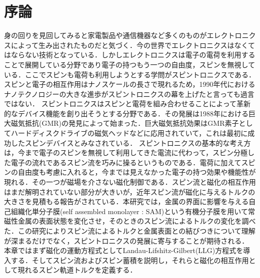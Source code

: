 
\chapter{序論}





身の回りを見回してみると家電製品や通信機器など多くのものがエレクトロニクスによって生み出されたものだと気づく．今の世界でエレクトロニクスはなくてはならない技術となっている．しかしエレクトロニクスは電子の電荷を利用することで展開している分野であり電子の持つもう一つの自由度，スピンを無視している．ここでスピンも電荷も利用しようとする学問がスピントロニクスである．スピンと電子の相互作用はナノスケールの長さで現れるため\cite{maekawa2002spin}，1990年代におけるナノテクノロジーの大きな進歩がスピントロニクスの幕を上げたと言っても過言ではない．
スピントロニクスはスピンと電荷を組み合わせることによって革新的なデバイス機能を創り出そうとする分野である\cite{prinz1998magnetoelectronics,vzutic2004spintronics,wolf2001spintronics}．その発展は1988年における巨大磁気抵抗(GMR)の発見\cite{baibich1988giant,binasch1989enhanced}によって始まった．巨大磁気抵抗効果はGMR素子としてハードディスクドライブの磁気ヘッドなどに応用されていて，これは最初に成功したスピンデバイスとみなされている．
スピントロニクスの基本的な考え方は，今まで電子のスピンを無視して利用してきた電流に代わって，スピン分極した電子の流れであるスピン流を巧みに操るというものである．電荷に加えてスピンの自由度も考慮に入れると，今までは見えなかった電子の持つ効果や機能性が現れる．その一つが磁場を介さない磁化制御である．スピン流と磁化の相互作用はまだ解明されていない部分が大きいが，近年スピン流が磁化に与えるトルクの大きさを見積もる報告がされている\cite{hayashi2014quantitative,yang2014platinum}．本研究では，金属の界面に影響を与える自己組織化単分子膜(self assembled monolayer : SAM)という有機分子膜\cite{de2005tuning,love2005self,xu2014regulating}を用いて常磁性金属の表面状態を変化させ，そのときのスピン流によるトルクの変化を調べた．この研究によりスピン流によるトルクと金属表面との結びつきについて理解が深まるだけでなく，スピントロニクスの発展に寄与することが期待される．
本章ではまず磁化の運動方程式としてLandau-Lifshitz-Gilbert(LLG)方程式を導入する．そしてスピン流およびスピン蓄積を説明し，それらと磁化の相互作用として現れるスピン軌道トルクを定義する．

